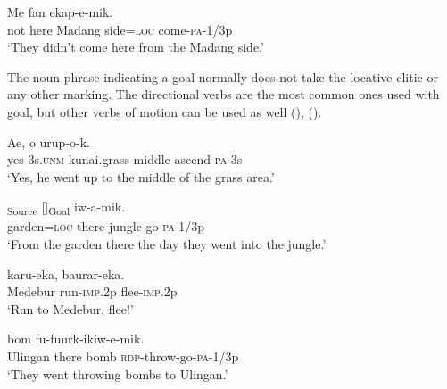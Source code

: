 \ea%
\label{ex:x864}
\gll Me  fan     ekap-e-mik. \\
   not  here  Madang  side=\textsc{loc}  come-\textsc{pa}-1/3p   \\
\glt`They didn't come here from the Madang side.'
\z





The noun phrase indicating a goal normally does not take the locative clitic or any other marking.  The directional verbs are the most common ones used with goal, but other verbs of motion can be used as well (), (). 

\ea%
\label{ex:x860}
\gll Ae,  o     urup-o-k. \\
    yes  3s.\textsc{unm}  kunai.grass  middle  ascend-\textsc{pa}-3s  \\
\glt`Yes, he went up to the middle of the  grass area.'
\z





\ea%
\label{ex:x861}
\gll [Manina=pa  nan]\textsubscript{Source}  []\textsubscript{Goal}  iw-a-mik. \\
    garden=\textsc{loc}  there  jungle  go-\textsc{pa}-1/3p  \\
\glt`From the garden there the day they went into the jungle.'
\z





\ea%
\label{ex:x862}
\gll {}  karu-eka,  baurar-eka. \\
   Medebur  run-\textsc{imp}.2p  flee-\textsc{imp}.2p   \\
\glt`Run to Medebur, flee!'
\z





\ea%
\label{ex:x863}
\gll {}   bom  fu-fuurk-ikiw-e-mik. \\
    Ulingan  there  bomb  \textsc{rdp}-throw-go-\textsc{pa}-1/3p  \\
\glt`They went throwing bombs to Ulingan.'
\z






